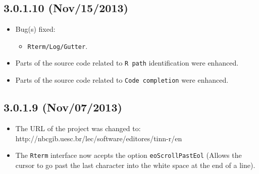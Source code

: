 \subsection*{3.0.1.10 (Nov/15/2013)}
\begin{itemize}
  \item Bug(s) fixed:
    \begin{itemize}
      \item \texttt{Rterm/Log/Gutter}.
    \end{itemize}
  \item Parts of the source code related to \texttt{R path} identification were enhanced.
  \item Parts of the source code related to \texttt{Code completion} were enhanced.
\end{itemize}


\subsection*{3.0.1.9 (Nov/07/2013)}
\begin{itemize}
  \item The URL of the project was changed to: http://nbcgib.uesc.br/lec/software/editores/tinn-r/en
  \item The \texttt{Rterm} interface now acepts the option \texttt{eoScrollPastEol}
   (Allows the cursor to go past the last character into the white space at the end of a line).
\end{itemize}



